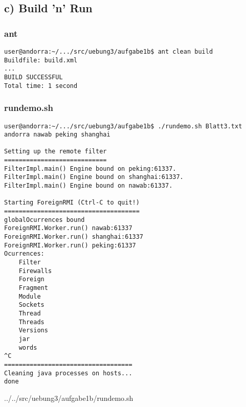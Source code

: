 \subsection*{c) Build 'n' Run}

\subsubsection*{ant}

\begin{verbatim}
user@andorra:~/.../src/uebung3/aufgabe1b$ ant clean build
Buildfile: build.xml
...
BUILD SUCCESSFUL
Total time: 1 second
\end{verbatim}

\subsubsection*{rundemo.sh}

\begin{verbatim}
user@andorra:~/.../src/uebung3/aufgabe1b$ ./rundemo.sh Blatt3.txt andorra nawab peking shanghai

Setting up the remote filter
============================
FilterImpl.main() Engine bound on peking:61337.
FilterImpl.main() Engine bound on shanghai:61337.
FilterImpl.main() Engine bound on nawab:61337.

Starting ForeignRMI (Ctrl-C to quit!)
=====================================
globalOcurrences bound
ForeignRMI.Worker.run() nawab:61337
ForeignRMI.Worker.run() shanghai:61337
ForeignRMI.Worker.run() peking:61337
Ocurrences:
	Filter
	Firewalls
	Foreign
	Fragment
	Module
	Sockets
	Thread
	Threads
	Versions
	jar
	words
^C
===================================
Cleaning java processes on hosts...
done

\end{verbatim}



{../../src/uebung3/aufgabe1b/rundemo.sh}
